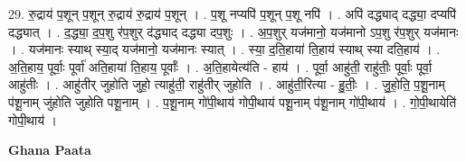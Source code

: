 \documentclass[17pt]{extarticle}
\begin{document}
29. रु॒द्राय॑ प॒शून् प॒शून् रु॒द्राय॑ रु॒द्राय॑ प॒शून् । . प॒शू नप्यपि॑ प॒शून् प॒शू नपि॑ । . अपि॑ दद्ध्याद् दद्ध्या॒ दप्यपि॑ दद्ध्यात् । . द॒द्ध्या॒ द॒प॒शु र॑प॒शुर् द॑द्ध्याद् दद्ध्या दप॒शुः । . अ॒प॒शुर् यज॑मानो॒ यज॑मानो ऽप॒शु र॑प॒शुर् यज॑मानः । . यज॑मानः स्याथ् स्या॒द् यज॑मानो॒ यज॑मानः स्यात् । . स्या॒ द॒ति॒हाया॑ ति॒हाय॑ स्याथ् स्या दति॒हाय॑ । . अ॒ति॒हाय॒ पूर्वाः॒ पूर्वा॑ अति॒हाया॑ ति॒हाय॒ पूर्वाः᳚ । . अ॒ति॒हायेत्य॑ति - हाय॑ । . पूर्वा॒ आहु॑ती॒ राहु॑तीः॒ पूर्वाः॒ पूर्वा॒ आहु॑तीः । . आहु॑तीर् जुहोति जुहो॒ त्याहु॑ती॒ राहु॑तीर् जुहोति । . आहु॑ती॒रित्या - हु॒तीः॒ । . जु॒हो॒ति॒ प॒शू॒नाम् प॑शू॒नाम् जु॑होति जुहोति पशू॒नाम् । . प॒शू॒नाम् गो॑पी॒थाय॑ गोपी॒थाय॑ पशू॒नाम् प॑शू॒नाम् गो॑पी॒थाय॑ । . गो॒पी॒थायेति॑ गोपी॒थाय॑ । \newline

\textbf{Ghana Paata } \newline
\end{document}
